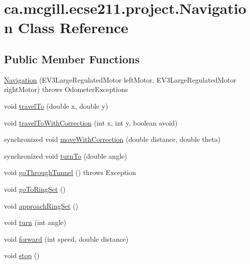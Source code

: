 \hypertarget{classca_1_1mcgill_1_1ecse211_1_1project_1_1_navigation}{}\section{ca.\+mcgill.\+ecse211.\+project.\+Navigation Class Reference}
\label{classca_1_1mcgill_1_1ecse211_1_1project_1_1_navigation}
\subsection*{Public Member Functions}
\begin{DoxyCompactItemize}
\item 
\hyperlink{classca_1_1mcgill_1_1ecse211_1_1project_1_1_navigation_aaee14b67c392ddd951e3ce21224c3e56}{Navigation} (E\+V3\+Large\+Regulated\+Motor left\+Motor, E\+V3\+Large\+Regulated\+Motor right\+Motor)  throws Odometer\+Exceptions 
\item 
void \hyperlink{classca_1_1mcgill_1_1ecse211_1_1project_1_1_navigation_ad89b3dd084d81b4ec4d89ea73ba13eaa}{travel\+To} (double x, double y)
\item 
void \hyperlink{classca_1_1mcgill_1_1ecse211_1_1project_1_1_navigation_ae7230e905494002087416294f12cae6a}{travel\+To\+With\+Correction} (int x, int y, boolean avoid)
\item 
synchronized void \hyperlink{classca_1_1mcgill_1_1ecse211_1_1project_1_1_navigation_a48eeb9ae2da23664421e8da5642054c7}{move\+With\+Correction} (double distance, double theta)
\item 
synchronized void \hyperlink{classca_1_1mcgill_1_1ecse211_1_1project_1_1_navigation_a3bbe0645f2b3b3d0986b4a707fb5a00c}{turn\+To} (double angle)
\item 
void \hyperlink{classca_1_1mcgill_1_1ecse211_1_1project_1_1_navigation_a4b52e605d3ea2f9bcd9481ae2c69ba39}{go\+Through\+Tunnel} ()  throws Exception 
\item 
void \hyperlink{classca_1_1mcgill_1_1ecse211_1_1project_1_1_navigation_a0016a23ab5d544148a09948fb1a40e4c}{go\+To\+Ring\+Set} ()
\item 
void \hyperlink{classca_1_1mcgill_1_1ecse211_1_1project_1_1_navigation_a1d8075346dbc151ca366e211e9056ccc}{approach\+Ring\+Set} ()
\item 
void \hyperlink{classca_1_1mcgill_1_1ecse211_1_1project_1_1_navigation_ad74286ad36d333bfaf57661837457b76}{turn} (int angle)
\item 
void \hyperlink{classca_1_1mcgill_1_1ecse211_1_1project_1_1_navigation_a7c66610c5b7496ddb35d342ab2cd3f08}{forward} (int speed, double distance)
\item 
void \hyperlink{classca_1_1mcgill_1_1ecse211_1_1project_1_1_navigation_ae8530d181ffd790ff9dea5eeab54b1a1}{stop} ()
\end{DoxyCompactItemize}
